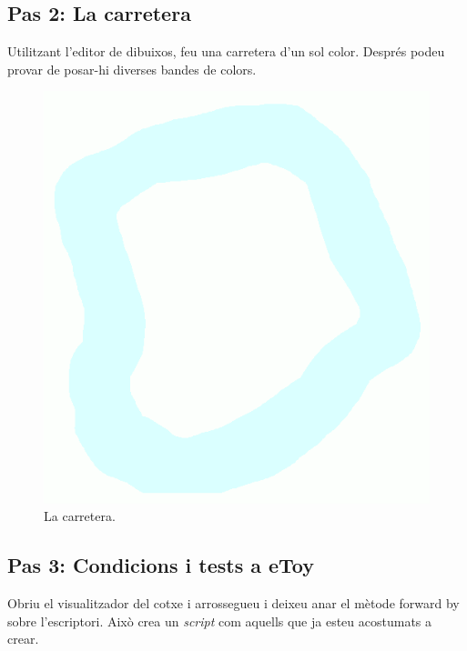 \subsection{Pas 2: La carretera}
Utilitzant l'editor de dibuixos, feu una carretera d'un sol color. Després podeu provar de posar-hi diverses bandes de colors.
\begin{figure}[h!]
\begin{center}
\includegraphics[scale=0.2]{Imatges/figura24-40}
\end{center}
\caption{La carretera.}
\label{fig2440}
\end{figure}

\subsection{Pas 3: Condicions i tests a eToy}
Obriu el visualitzador del  cotxe i arrossegueu i deixeu anar el mètode \textsf{forward by} sobre l'escriptori. Això crea un \emph{script} com aquells que ja esteu acostumats a crear.

